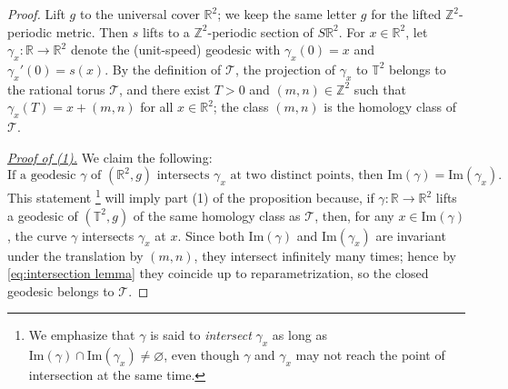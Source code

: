 \documentclass[11pt,letterpaper,oneside]{amsart}
\newcommand{\Z}{\mathbb{Z}}
\newcommand{\R}{\mathbb{R}}
\newcommand{\T}{\mathbb{T}}
\newcommand{\im}{\text{Im}}
\theoremstyle{definition}
\theoremstyle{remark}
\theoremstyle{definition}
\theoremstyle{remark}
\newcommand{\CT}{\mathcal{T}}
\begin{document}
\begin{proof}
    Lift $g$ to the universal cover $\R^2$; we keep the same letter $g$ for the lifted $\Z^2$-periodic metric.
    Then $s$ lifts to a $\Z^2$-periodic section of $S\R^2$.
    For $x\in \R^2$, let $\gamma_x:\R\to \R^2$ denote the (unit-speed) geodesic with $\gamma_x(0)=x$ and $\gamma_x'(0)=s(x)$.
    By the definition of $\CT$, the projection of $\gamma_x$ to $\T^2$ belongs to the rational torus $\CT$, and there exist $T > 0$ and $(m,n) \in \Z^2$ such that $\gamma_x(T) = x + (m,n)$ for all $x \in \R^2$; the class $(m,n)$ is the homology class of $\CT$.

     
    
\medskip

    \noindent\underline{\textit{Proof of (1).}} 
    We claim the following: 
    \begin{equation}\label{eq:intersection lemma}
        \text{If a geodesic $\gamma$ of $(\R^2,g)$ intersects $\gamma_x$ at two distinct points, then $\im(\gamma)=\im(\gamma_x)$.}
    \end{equation}
    This statement
    \footnote{We emphasize that $\gamma$ is said to \textit{intersect} $\gamma_x$ as long as $\im(\gamma) \cap \im(\gamma_x) \neq \varnothing$, even though $\gamma$ and $\gamma_x$ may not reach the point of intersection at the same time.}
    will imply part (1) of the proposition because, if $\gamma:\R \to \R^2$ lifts a geodesic of $(\T^2, g)$ of the same homology class as $\CT$, then, for any $x \in \im(\gamma)$, the curve $\gamma$ intersects $\gamma_x$ at $x$.
    Since both $\im(\gamma)$ and $\im(\gamma_x)$ are invariant under the translation by $(m,n)$, they intersect infinitely many times; hence by \eqref{eq:intersection lemma} they coincide up to reparametrization, so the closed geodesic belongs to $\CT$. 

\medskip


\end{proof}
\end{document}
